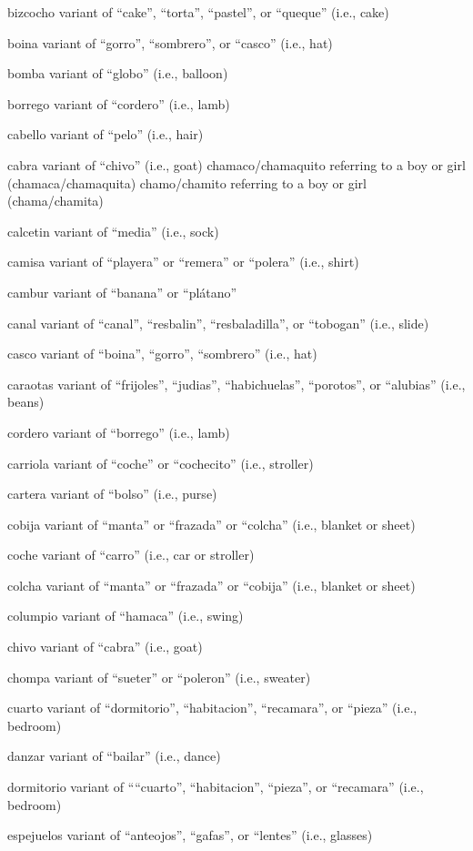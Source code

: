 \documentclass[
]{book}
\begin{document}
bizcocho
variant of ``cake'', ``torta'', ``pastel'', or ``queque'' (i.e., cake)

boina
variant of ``gorro'', ``sombrero'', or ``casco'' (i.e., hat)

bomba
variant of ``globo'' (i.e., balloon)

borrego
variant of ``cordero'' (i.e., lamb)

cabello
variant of ``pelo'' (i.e., hair)

cabra
variant of ``chivo'' (i.e., goat)
chamaco/chamaquito
referring to a boy or girl (chamaca/chamaquita)
chamo/chamito
referring to a boy or girl (chama/chamita)

calcetin
variant of ``media'' (i.e., sock)

camisa
variant of ``playera'' or ``remera'' or ``polera'' (i.e., shirt)

cambur
variant of ``banana'' or ``plátano''

canal
variant of ``canal'', ``resbalin'', ``resbaladilla'', or ``tobogan'' (i.e., slide)

casco
variant of ``boina'', ``gorro'', ``sombrero'' (i.e., hat)

caraotas
variant of ``frijoles'', ``judias'', ``habichuelas'', ``porotos'', or ``alubias'' (i.e., beans)

cordero
variant of ``borrego'' (i.e., lamb)

carriola
variant of ``coche'' or ``cochecito'' (i.e., stroller)

cartera
variant of ``bolso'' (i.e., purse)

cobija
variant of ``manta'' or ``frazada'' or ``colcha'' (i.e., blanket or sheet)

coche
variant of ``carro'' (i.e., car or stroller)

colcha
variant of ``manta'' or ``frazada'' or ``cobija'' (i.e., blanket or sheet)

columpio
variant of ``hamaca'' (i.e., swing)

chivo
variant of ``cabra'' (i.e., goat)

chompa
variant of ``sueter'' or ``poleron'' (i.e., sweater)

cuarto
variant of ``dormitorio'', ``habitacion'', ``recamara'', or ``pieza'' (i.e., bedroom)

danzar
variant of ``bailar'' (i.e., dance)

dormitorio
variant of ````cuarto'', ``habitacion'', ``pieza'', or ``recamara'' (i.e., bedroom)

espejuelos
variant of ``anteojos'', ``gafas'', or ``lentes'' (i.e., glasses)
\end{document}
